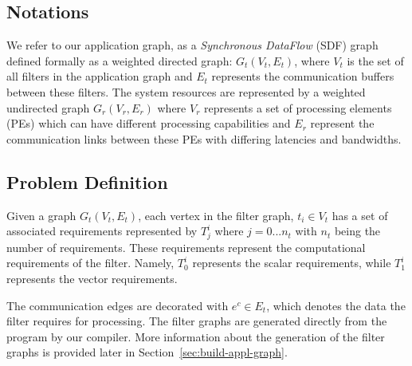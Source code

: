 \documentclass[10pt, conference, compsocconf]{IEEEtran}
\begin{document}
\subsection{Notations}

We refer to our application graph, as a \textit{Synchronous DataFlow }
(SDF) graph defined formally as a weighted directed graph: $G_t(V_t,
E_t)$, where $V_t$ is the set of all filters in the application graph
and $E_t$ represents the communication buffers between these
filters. The system resources are represented by a weighted undirected
graph $G_r(V_r, E_r)$ where $V_r$ represents a set of processing
elements (PEs) which can have different processing capabilities and
$E_r$ represent the communication links between these PEs with differing
latencies and bandwidths. %

\subsection{Problem Definition}

Given a graph $G_t(V_t, E_t)$, each vertex in the filter graph, $t_i \in
V_t$ has a set of associated requirements represented by $T^{i}_{j}$
where $j=0...n_t$ with $n_t$ being the number of requirements. These
requirements represent the computational requirements of the
filter. Namely, $T^i_0$ represents the scalar requirements, while
$T^i_1$ represents the vector requirements.


The communication edges are decorated with \mbox{$e^c \in E_t$}, which
denotes the data the filter requires for processing.
The filter graphs are generated directly from the program by our compiler. More
information about the generation of the filter graphs is provided later in
Section~\ref{sec:build-appl-graph}.
\end{document}
